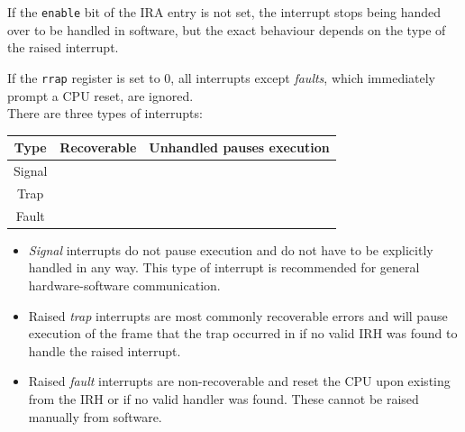 \documentclass[a4paper,10pt]{article}
\newcommand{\cmark}{\ding{51}}%
\newcommand{\xmark}{\ding{55}}%
\begin{document}
If the \verb|enable| bit of the IRA entry is not set, the interrupt stops being handed over to be handled in software, but the exact behaviour depends on the type of the raised interrupt.

If the \verb|rrap| register is set to 0, all interrupts except \emph{faults}, which immediately prompt a CPU reset, are ignored. \\

There are three types of interrupts:

\begin{table}[H]
	\centering
	{
		\begin{tabular}{|c|c|c|}
\hline
Type & Recoverable & Unhandled pauses execution \\
\hline
Signal & \cmark & \xmark \\
\hline
Trap & \cmark & \cmark \\
\hline
Fault & \xmark & \cmark \\
\hline
		\end{tabular}
	}
\end{table}

\begin{itemize}
	\item \emph{Signal} interrupts do not pause execution and do not have to be explicitly handled in any way. This type of interrupt is recommended for general hardware-software communication.
	\item Raised \emph{trap} interrupts are most commonly recoverable errors and will pause execution of the frame that the trap occurred in if no valid IRH was found to handle the raised interrupt.
	\item Raised \emph{fault} interrupts are non-recoverable and reset the CPU upon existing from the IRH or if no valid handler was found. These cannot be raised manually from software.
\end{itemize}

\end{document}
